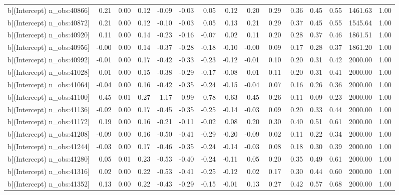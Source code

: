 \begin{table}[ht]
\begin{tabular}{rrrrrrrrrrrrrrr}
  b[(Intercept) n\_obs:40866] & 0.21 & 0.00 & 0.12 & -0.09 & -0.03 & 0.05 & 0.12 & 0.20 & 0.29 & 0.36 & 0.45 & 0.55 & 1461.63 & 1.00 \\ 
  b[(Intercept) n\_obs:40872] & 0.21 & 0.00 & 0.12 & -0.10 & -0.03 & 0.05 & 0.13 & 0.21 & 0.29 & 0.37 & 0.45 & 0.55 & 1545.64 & 1.00 \\ 
  b[(Intercept) n\_obs:40920] & 0.11 & 0.00 & 0.14 & -0.23 & -0.16 & -0.07 & 0.02 & 0.11 & 0.20 & 0.28 & 0.37 & 0.46 & 1861.51 & 1.00 \\ 
  b[(Intercept) n\_obs:40956] & -0.00 & 0.00 & 0.14 & -0.37 & -0.28 & -0.18 & -0.10 & -0.00 & 0.09 & 0.17 & 0.28 & 0.37 & 1861.20 & 1.00 \\ 
  b[(Intercept) n\_obs:40992] & -0.01 & 0.00 & 0.17 & -0.42 & -0.33 & -0.23 & -0.12 & -0.01 & 0.10 & 0.20 & 0.31 & 0.42 & 2000.00 & 1.00 \\ 
  b[(Intercept) n\_obs:41028] & 0.01 & 0.00 & 0.15 & -0.38 & -0.29 & -0.17 & -0.08 & 0.01 & 0.11 & 0.20 & 0.31 & 0.41 & 2000.00 & 1.00 \\ 
  b[(Intercept) n\_obs:41064] & -0.04 & 0.00 & 0.16 & -0.42 & -0.35 & -0.24 & -0.15 & -0.04 & 0.07 & 0.16 & 0.26 & 0.36 & 2000.00 & 1.00 \\ 
  b[(Intercept) n\_obs:41100] & -0.45 & 0.01 & 0.27 & -1.17 & -0.99 & -0.78 & -0.63 & -0.45 & -0.26 & -0.11 & 0.09 & 0.23 & 2000.00 & 1.00 \\ 
  b[(Intercept) n\_obs:41136] & -0.02 & 0.00 & 0.17 & -0.45 & -0.35 & -0.25 & -0.14 & -0.03 & 0.09 & 0.20 & 0.33 & 0.44 & 2000.00 & 1.00 \\ 
  b[(Intercept) n\_obs:41172] & 0.19 & 0.00 & 0.16 & -0.21 & -0.11 & -0.02 & 0.08 & 0.20 & 0.30 & 0.40 & 0.51 & 0.61 & 2000.00 & 1.00 \\ 
  b[(Intercept) n\_obs:41208] & -0.09 & 0.00 & 0.16 & -0.50 & -0.41 & -0.29 & -0.20 & -0.09 & 0.02 & 0.11 & 0.22 & 0.34 & 2000.00 & 1.00 \\ 
  b[(Intercept) n\_obs:41244] & -0.03 & 0.00 & 0.17 & -0.46 & -0.35 & -0.24 & -0.14 & -0.03 & 0.08 & 0.18 & 0.30 & 0.39 & 2000.00 & 1.00 \\ 
  b[(Intercept) n\_obs:41280] & 0.05 & 0.01 & 0.23 & -0.53 & -0.40 & -0.24 & -0.11 & 0.05 & 0.20 & 0.35 & 0.49 & 0.61 & 2000.00 & 1.00 \\ 
  b[(Intercept) n\_obs:41316] & 0.02 & 0.00 & 0.22 & -0.53 & -0.41 & -0.25 & -0.12 & 0.02 & 0.17 & 0.30 & 0.44 & 0.60 & 2000.00 & 1.00 \\ 
  b[(Intercept) n\_obs:41352] & 0.13 & 0.00 & 0.22 & -0.43 & -0.29 & -0.15 & -0.01 & 0.13 & 0.27 & 0.42 & 0.57 & 0.68 & 2000.00 & 1.00 \\ 

\end{tabular}
\end{table}
